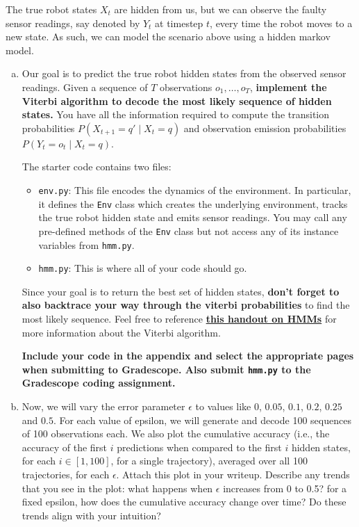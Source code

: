 \documentclass{article}
\begin{document}
The true robot states $X_t$ are hidden from us, but we can observe the faulty sensor readings, say denoted by $Y_t$ at timestep $t$, every time the robot moves to a new state. 
As such, we can model the scenario above using a hidden markov model.

\begin{enumerate}[(a)]
    \item 
    Our goal is to predict the true robot hidden states from the observed sensor readings. 
    Given a sequence of $T$ observations $o_1, \dots, o_T$, \textbf{implement the Viterbi algorithm to decode the most likely sequence of hidden states.} 
    You have all the information required to compute the transition probabilities $P(X_{t+1} = q' \mid X_t = q)$ and observation emission probabilities $P(Y_t = o_t \mid X_t = q)$.

    The starter code contains two files:
    \begin{itemize}
        \item \texttt{env.py}: This file encodes the dynamics of the environment.
        In particular, it defines the \texttt{Env} class which creates the underlying environment, tracks the true robot hidden state and emits sensor readings.  
        You may call any pre-defined methods of the \texttt{Env} class but not access any of its instance variables from \texttt{hmm.py}.
        \item \texttt{hmm.py}: This is where all of your code should go.
    \end{itemize}

    Since your goal is to return the best set of hidden states, \textbf{don't forget to also backtrace your way through the viterbi probabilities} to find the most likely sequence. Feel free to reference \href{https://web.stanford.edu/~jurafsky/slp3/A.pdf}{\textbf{this handout on HMMs}} for more information about the Viterbi algorithm.

    \textbf{Include your code in the appendix and select the appropriate pages when submitting to Gradescope. Also submit \texttt{hmm.py} to the Gradescope coding assignment.}

    \item 
    Now, we will vary the error parameter $\epsilon$ to values like $0$, $0.05$, $0.1$, $0.2$, $0.25$ and $0.5$. For each value of epsilon, we will generate and decode 100 sequences of 100 observations each. We also plot the cumulative accuracy (i.e., the accuracy of the first $i$ predictions when compared to the first $i$ hidden states, for each $i \in [1, 100]$, for a single trajectory), averaged over all 100 trajectories, for each $\epsilon$. Attach this plot in your writeup. Describe any trends that you see in the plot: what happens when $\epsilon$ increases from 0 to 0.5? for a fixed epsilon, how does the cumulative accuracy change over time? Do these trends align with your intuition?


\end{enumerate}
\end{document}

